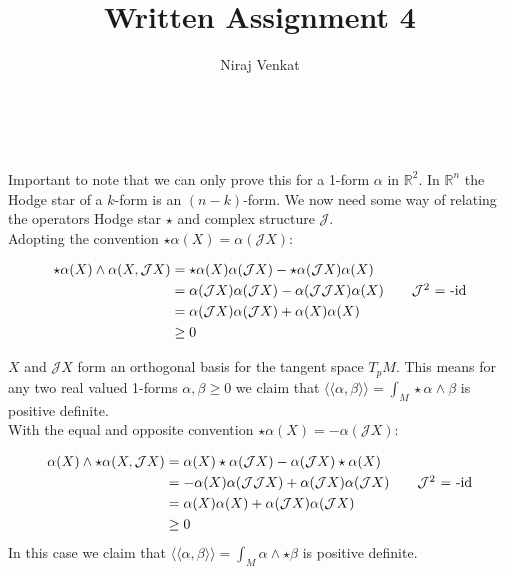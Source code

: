 \documentclass{article}
\def\cJ{\mathcal{J}}
\def\R{\mathbb{R}}
\def\R{\mathbb{R}}
\begin{document}
\title{Written Assignment 4}

\author{Niraj Venkat}

\date{}

\maketitle

\vspace{.8cm}
\\\\

Important to note that we can only prove this for a 1-form $\alpha$ in $\R^2$. In $\R^n$ the Hodge star of a 
$k$-form is an $(n-k)$-form. We now need some way of relating the operators Hodge star $\star$ and complex structure $\cJ$.\\

Adopting the convention $\star\alpha(X) = \alpha(\cJ X)$:

\begin{align*}
    \star\alpha(X) \wedge \alpha(X, \cJ X) &= \star\alpha(X)\alpha(\cJ X) - \star\alpha(\cJ X)\alpha(X) \\
        &= \alpha(\cJ X)\alpha(\cJ X) - \alpha(\cJ \cJ X)\alpha(X) \tag*{$\cJ^2$ = -id} \\
        &= \alpha(\cJ X)\alpha(\cJ X) + \alpha(X)\alpha(X) \\
        &\ge 0
\end{align*}

$X$ and $\cJ X$ form an orthogonal basis for the tangent space $T_pM$. This means for any two 
real valued 1-forms $\alpha, \beta \ge 0$ we claim that 
$\langle \langle \alpha, \beta \rangle \rangle = \int_M \star\alpha \wedge \beta$ is positive definite.\\

With the equal and opposite convention $\star\alpha(X) = - \alpha(\cJ X)$:

\begin{align*}
    \alpha(X) \wedge \star\alpha(X, \cJ X) &= \alpha(X)\star\alpha(\cJ X) - \alpha(\cJ X)\star\alpha(X) \\
        &= -\alpha(X)\alpha(\cJ \cJ X) + \alpha(\cJ X)\alpha(\cJ X) \tag*{$\cJ^2$ = -id} \\
        &= \alpha(X)\alpha(X) + \alpha(\cJ X)\alpha(\cJ X) \\
        &\ge 0
\end{align*}
In this case we claim that 
$\langle \langle \alpha, \beta \rangle \rangle = \int_M \alpha \wedge \star\beta$ is positive definite.
\end{document}
